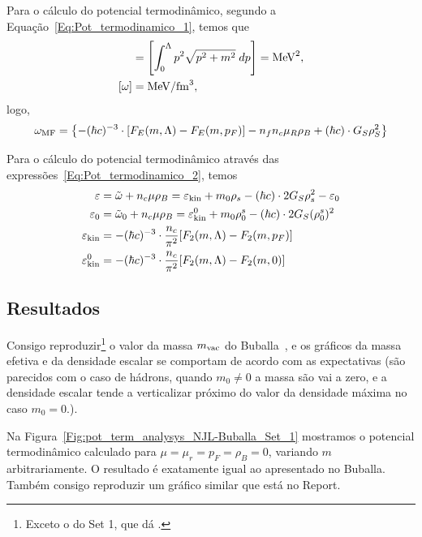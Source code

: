 Para o cálculo do potencial termodinâmico, segundo a Equação~\ref{Eq:Pot_termodinamico_1}, temos que
\begin{align}
	[F_E] &= \left[\int_0^\Lambda p^2\sqrt{p^2+m^2} \;dp\right] = \rm{MeV}^2, \\
	[\omega] &= \rm{MeV}/\rm{fm}^3,
\end{align}
%
logo,
\begin{equation}
	\omega_{\rm{MF}} = \left\{- (\hbar c)^{-3} \cdot [F_E(m, \Lambda) - F_E(m, p_F)] - n_fn_c\mu_R\rho_B + (\hbar c) \cdot G_S\rho_S^2\right\}
\end{equation}

Para o cálculo do potencial termodinâmico através das expressões~\eqref{Eq:Pot_termodinamico_2}, temos
\begin{subequations}
\begin{align}
	\varepsilon &= \tilde{\omega} + n_c\mu\rho_B = \varepsilon_{\rm{kin}} + m_0\rho_s - (\hbar c) \cdot 2G_S\rho_s^2 - \varepsilon_0\\
	\varepsilon_0 &= \tilde{\omega}_0 + n_c\mu\rho_B = \varepsilon_{\rm{kin}}^0 + m_0\rho_0^s - (\hbar c) \cdot 2G_S(\rho_0^s)^2 \\
	\varepsilon_{\rm{kin}} &= -(\hbar c)^{-3} \cdot \frac{n_c}{\pi^2} [F_2(m, \Lambda) - F_2(m, p_F)] \\
	\varepsilon_{\rm{kin}}^0 &= -(\hbar c)^{-3} \cdot \frac{n_c}{\pi^2} [F_2(m, \Lambda) - F_2(m, 0)]
\end{align}
\end{subequations}

\subsection{Resultados}

Consigo reproduzir\footnote{Exceto o do Set 1, que dá .} o valor da massa $m_{\rm{vac}}$ do Buballa~\cite{Buballa1996}, e os gráficos da massa efetiva e da densidade escalar se comportam de acordo com as expectativas (são parecidos com o caso de hádrons, quando $m_0 \neq 0$ a massa são vai a zero, e a densidade escalar tende a verticalizar próximo do valor da densidade máxima no caso $m_0 = 0$.).

Na Figura~\ref{Fig:pot_term_analysys_NJL-Buballa_Set_1} mostramos o potencial termodinâmico calculado para $\mu = \mu_r = p_F = \rho_B = 0$, variando $m$ arbitrariamente. O resultado é exatamente igual ao apresentado no Buballa. Também consigo reproduzir um gráfico similar que está no Report.

